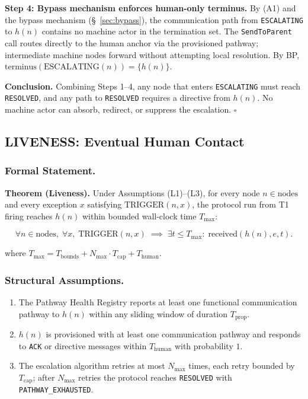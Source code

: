 \medskip
\noindent\textbf{Step 4: Bypass mechanism enforces human-only terminus.} By (A1) and the bypass mechanism (\S~\ref{sec:bypass}), the communication path from \texttt{ESCALATING} to $h(n)$ contains no machine actor in the termination set. The \texttt{SendToParent} call routes directly to the human anchor via the provisioned pathway; intermediate machine nodes forward without attempting local resolution. By BP, $\text{terminus}(\text{ESCALATING}(n)) = \{h(n)\}$.

\medskip
\noindent\textbf{Conclusion.} Combining Steps 1--4, any node that enters \texttt{ESCALATING} must reach \texttt{RESOLVED}, and any path to \texttt{RESOLVED} requires a directive from $h(n)$. No machine actor can absorb, redirect, or suppress the escalation. $\square$

\subsection{LIVENESS: Eventual Human Contact}

\subsubsection{Formal Statement.}

\begin{bluebox}
\textbf{Theorem (Liveness).} Under Assumptions (L1)--(L3), for every node $n \in \text{nodes}$ and every exception $x$ satisfying $\text{TRIGGER}(n, x)$, the protocol run from T1 firing reaches $h(n)$ within bounded wall-clock time $T_{\max}$:

\[
\forall n \in \text{nodes},\; \forall x,\;
\text{TRIGGER}(n, x) \;\implies\;
\exists t \leq T_{\max}:\; \text{received}(h(n), e, t).
\tag{LIVENESS}
\]

where $T_{\max} = T_{\text{bounds}} + N_{\max} \cdot T_{\text{cap}} + T_{\text{human}}$.
\end{bluebox}

\subsubsection{Structural Assumptions.}

\begin{enumerate}
\item[(L1)] The Pathway Health Registry reports at least one functional communication pathway to $h(n)$ within any sliding window of duration $T_{\text{prop}}$.
\item[(L2)] $h(n)$ is provisioned with at least one communication pathway and responds to \texttt{ACK} or directive messages within $T_{\text{human}}$ with probability $1$.
\item[(L3)] The escalation algorithm retries at most $N_{\max}$ times, each retry bounded by $T_{\text{cap}}$; after $N_{\max}$ retries the protocol reaches \texttt{RESOLVED} with \texttt{PATHWAY\_EXHAUSTED}.
\end{enumerate}

